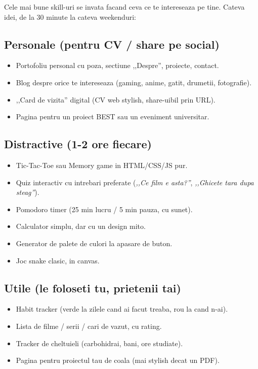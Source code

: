 Cele mai bune skill-uri se invata facand ceva ce te intereseaza pe tine. Cateva idei, de la 30 minute la cateva weekenduri:

\subsection*{Personale (pentru CV / share pe social)}

\begin{itemize}[itemsep=2pt]
  \item Portofoliu personal cu poza, sectiune ,,Despre'', proiecte, contact.
  \item Blog despre orice te intereseaza (gaming, anime, gatit, drumetii, fotografie).
  \item ,,Card de vizita'' digital (CV web stylish, share-uibil prin URL).
  \item Pagina pentru un proiect BEST sau un eveniment universitar.
\end{itemize}

\subsection*{Distractive (1-2 ore fiecare)}

\begin{itemize}[itemsep=2pt]
  \item Tic-Tac-Toe sau Memory game in HTML/CSS/JS pur.
  \item Quiz interactiv cu intrebari preferate (\emph{,,Ce film e asta?''}, \emph{,,Ghicete tara dupa steag''}).
  \item Pomodoro timer (25 min lucru / 5 min pauza, cu sunet).
  \item Calculator simplu, dar cu un design mito.
  \item Generator de palete de culori la apasare de buton.
  \item Joc snake clasic, in canvas.
\end{itemize}

\subsection*{Utile (le foloseti tu, prietenii tai)}

\begin{itemize}[itemsep=2pt]
  \item Habit tracker (verde la zilele cand ai facut treaba, rou la cand n-ai).
  \item Lista de filme / serii / cari de vazut, cu rating.
  \item Tracker de cheltuieli (carbohidrai, bani, ore studiate).
  \item Pagina pentru proiectul tau de coala (mai stylish decat un PDF).
\end{itemize}

